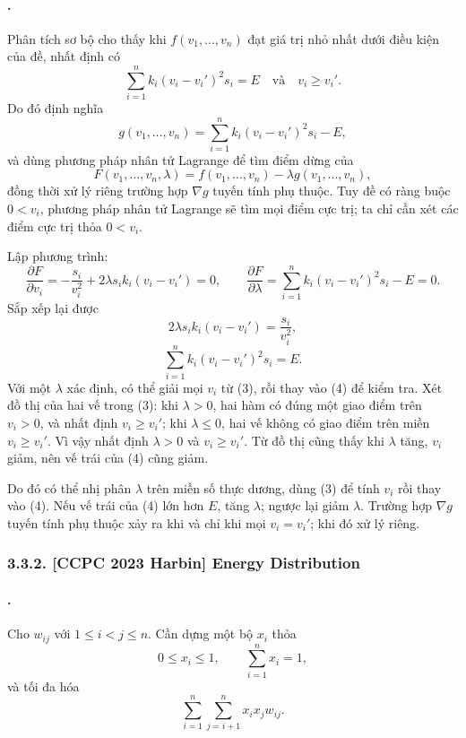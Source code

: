 \documentclass[11pt]{article}
\begin{document}
\paragraph{.}
Phân tích sơ bộ cho thấy khi \(f(v_1,\ldots,v_n)\) đạt giá trị nhỏ nhất dưới
điều kiện của đề, nhất định có
\[
  \sum_{i=1}^{n} k_i(v_i-v_i')^2s_i=E
  \quad\text{và}\quad v_i\ge v_i'.
\]
Do đó định nghĩa
\[
  g(v_1,\ldots,v_n)=\sum_{i=1}^{n} k_i(v_i-v_i')^2s_i-E,
\]
và dùng phương pháp nhân tử Lagrange để tìm điểm dừng của
\[
  F(v_1,\ldots,v_n,\lambda)
  =f(v_1,\ldots,v_n)-\lambda g(v_1,\ldots,v_n),
\]
đồng thời xử lý riêng trường hợp \(\nabla g\) tuyến tính phụ thuộc. Tuy đề có
ràng buộc \(0<v_i\), phương pháp nhân tử Lagrange sẽ tìm mọi điểm cực trị; ta
chỉ cần xét các điểm cực trị thỏa \(0<v_i\).

Lập phương trình:
\[
  \frac{\partial F}{\partial v_i}
  =-\frac{s_i}{v_i^2}+2\lambda s_i k_i(v_i-v_i')=0,\qquad
  \frac{\partial F}{\partial\lambda}
  =\sum_{i=1}^{n} k_i(v_i-v_i')^2s_i-E=0.
\]
Sắp xếp lại được
\[
  2\lambda s_i k_i(v_i-v_i')=\frac{s_i}{v_i^2},
\tag{3}
\]
\[
  \sum_{i=1}^{n} k_i(v_i-v_i')^2s_i=E.
\tag{4}
\]
Với một \(\lambda\) xác định, có thể giải mọi \(v_i\) từ (3), rồi thay vào (4)
để kiểm tra. Xét đồ thị của hai vế trong (3): khi \(\lambda>0\), hai hàm có
đúng một giao điểm trên \(v_i>0\), và nhất định \(v_i\ge v_i'\); khi
\(\lambda\le 0\), hai vế không có giao điểm trên miền \(v_i\ge v_i'\). Vì vậy
nhất định \(\lambda>0\) và \(v_i\ge v_i'\). Từ đồ thị cũng thấy khi
\(\lambda\) tăng, \(v_i\) giảm, nên vế trái của (4) cũng giảm.

Do đó có thể nhị phân \(\lambda\) trên miền số thực dương, dùng (3) để tính
\(v_i\) rồi thay vào (4). Nếu vế trái của (4) lớn hơn \(E\), tăng
\(\lambda\); ngược lại giảm \(\lambda\). Trường hợp \(\nabla g\) tuyến tính
phụ thuộc xảy ra khi và chỉ khi mọi \(v_i=v_i'\); khi đó xử lý riêng.

\subsubsection*{3.3.2. [CCPC 2023 Harbin] Energy Distribution}

\paragraph{.}
Cho \(w_{ij}\) với \(1\le i<j\le n\). Cần dựng một bộ \(x_i\) thỏa
\[
  0\le x_i\le 1,\qquad \sum_{i=1}^{n}x_i=1,
\]
và tối đa hóa
\[
  \sum_{i=1}^{n}\sum_{j=i+1}^{n} x_i x_j w_{ij}.
\]
\end{document}
